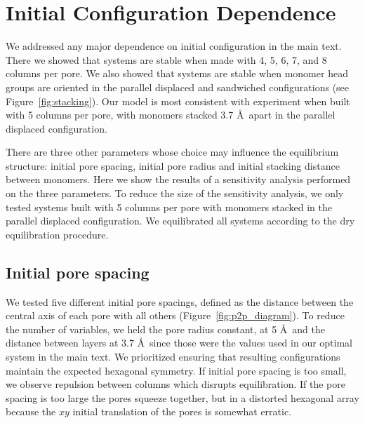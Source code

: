 \documentclass{article}
\begin{document}
  \section{Initial Configuration Dependence}\label{section:initial_config_dependence}

  We addressed any major dependence on initial configuration in the main text.
  There we showed that systems are stable when made with 4, 5, 6, 7, and 8
  columns per pore. We also showed that systems are stable when monomer head
  groups are oriented in the parallel displaced and sandwiched configurations
  (see Figure~\ref{fig:stacking}). Our model is most consistent with experiment
  when built with 5 columns per pore, with monomers stacked 3.7 \AA~apart in 
  the parallel displaced configuration. 

  There are three other parameters whose choice may influence the equilibrium
  structure: initial pore spacing, initial pore radius and initial stacking distance
  between monomers. Here we show the results of a sensitivity analysis performed
  on the three parameters. To reduce the size of the sensitivity analysis, we
  only tested systems built with 5 columns per pore with monomers stacked in 
  the parallel displaced configuration. We equilibrated all systems according
  to the dry equilibration procedure.

  \subsection{Initial pore spacing}\label{section:initial_pore_spacing}

  We tested five different initial pore spacings, defined as the
  distance between the central axis of each pore with all others
  (Figure~\ref{fig:p2p_diagram}). To reduce the number of variables, we held the
  pore radius constant, at 5 \AA~and the distance between layers at 3.7 \AA~since
  those were the values used in our optimal system in the main text. We
  prioritized ensuring that resulting configurations maintain the expected
  hexagonal symmetry. If initial pore spacing is too small, we observe repulsion
  between columns which disrupts equilibration. If the pore spacing is too large
  the pores squeeze together, but in a distorted hexagonal array because the $xy$
  initial translation of the pores is somewhat erratic. 

\end{document}
